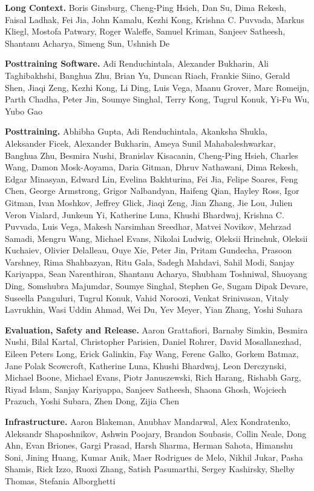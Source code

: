 \textbf{Long Context.} Boris Ginsburg, Cheng-Ping Hsieh, Dan Su, Dima Rekesh, Faisal Ladhak, Fei Jia, John Kamalu, Kezhi Kong, Krishna C. Puvvada, Markus Kliegl, Mostofa Patwary, Roger Waleffe, Samuel Kriman, Sanjeev Satheesh, Shantanu Acharya, Simeng Sun, Ushnish De

\textbf{Posttraining Software.} Adi Renduchintala, Alexander Bukharin, Ali Taghibakhshi, Banghua Zhu, Brian Yu, Duncan Riach, Frankie Siino, Gerald Shen, Jiaqi Zeng, Kezhi Kong, Li Ding, Luis Vega, Maanu Grover, Marc Romeijn, Parth Chadha, Peter Jin, Soumye Singhal, Terry Kong, Tugrul Konuk, Yi-Fu Wu, Yubo Gao

\textbf{Posttraining.} Abhibha Gupta, Adi Renduchintala, Akanksha Shukla, Aleksander Ficek, Alexander Bukharin, Ameya Sunil Mahabaleshwarkar, Banghua Zhu, Besmira Nushi, Branislav Kisacanin, Cheng-Ping Hsieh, Charles Wang, Damon Mosk-Aoyama, Daria Gitman, Dhruv Nathawani, Dima Rekesh, Edgar Minasyan, Edward Lin, Evelina Bakhturina, Fei Jia, Felipe Soares, Feng Chen, George Armstrong, Grigor Nalbandyan, Haifeng Qian, Hayley Ross, Igor Gitman, Ivan Moshkov, Jeffrey Glick, Jiaqi Zeng, Jian Zhang, Jie Lou, Julien Veron Vialard, Junkeun Yi, Katherine Luna, Khushi Bhardwaj, Krishna C. Puvvada, Luis Vega, Makesh Narsimhan Sreedhar, Matvei Novikov, Mehrzad Samadi, Mengru Wang, Michael Evans, Nikolai Ludwig, Oleksii Hrinchuk, Oleksii Kuchaiev, Olivier Delalleau, Ouye Xie, Peter Jin, Pritam Gundecha, Prasoon Varshney, Rima Shahbazyan, Ritu Gala, Sadegh Mahdavi, Sahil Modi, Sanjay Kariyappa, Sean Narenthiran, Shantanu Acharya, Shubham Toshniwal, Shuoyang Ding, Somshubra Majumdar, Soumye Singhal, Stephen Ge, Sugam Dipak Devare, Suseella Panguluri, Tugrul Konuk, Vahid Noroozi, Venkat Srinivasan, Vitaly Lavrukhin, Wasi Uddin Ahmad, Wei Du, Yev Meyer, Yian Zhang, Yoshi Suhara

\textbf{Evaluation, Safety and Release.} Aaron Grattafiori, Barnaby Simkin, Besmira Nushi, Bilal Kartal, Christopher Parisien, Daniel Rohrer, David Mosallanezhad, Eileen Peters Long, Erick Galinkin, Fay Wang, Ferenc Galko, Gorkem Batmaz, Jane Polak Scowcroft, Katherine Luna, Khushi Bhardwaj, Leon Derczynski, Michael Boone, Michael Evans, Piotr Januszewski, Rich Harang, Rishabh Garg, Riyad Islam, Sanjay Kariyappa, Sanjeev Satheesh, Shaona Ghosh, Wojciech Prazuch, Yoshi Subara, Zhen Dong, Zijia Chen

\textbf{Infrastructure.} Aaron Blakeman, Anubhav Mandarwal, Alex Kondratenko, Aleksandr Shaposhnikov, Ashwin Poojary, Brandon Soubasis, Collin Neale, Dong Ahn, Evan Briones, Gargi Prasad, Harsh Sharma, Herman Sahota, Himanshu Soni, Jining Huang, Kumar Anik, Maer Rodrigues de Melo, Nikhil Jukar, Pasha Shamis, Rick Izzo, Ruoxi Zhang, Satish Pasumarthi, Sergey Kashirsky, Shelby Thomas, Stefania Alborghetti

